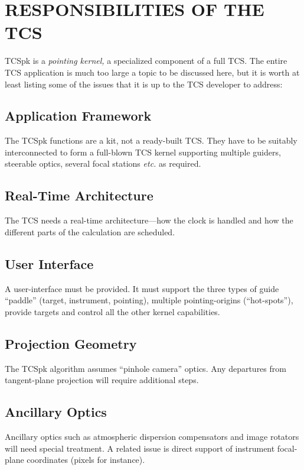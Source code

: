 \documentclass[12pt,fleqn,twoside]{article}
\renewcommand{\_}{{\tt\char'137}}     %
\begin{document}
\newpage
\section {RESPONSIBILITIES OF THE TCS}

TCSpk is a {\it pointing kernel,} a specialized component of
a full TCS.  The entire TCS application
is much too large a topic to be discussed here,
but it is worth at least listing some of the issues that
it is up to the TCS developer to address:

\subsection{Application Framework}

The TCSpk functions are a kit, not a ready-built TCS.
They have to be suitably
interconnected to form a full-blown TCS kernel supporting
multiple guiders, steerable optics, several focal stations {\it
etc.}\/ as required.

\subsection{Real-Time Architecture}

The TCS needs a real-time architecture---how
the clock is handled and how the different parts of the
calculation are scheduled.

\subsection{User Interface}
A user-interface must be provided.  It must support the
three types of guide ``paddle'' (target, instrument, pointing),
multiple pointing-origins (``hot-spots''), provide targets
and control all the other kernel capabilities.

\subsection{Projection Geometry}

The TCSpk algorithm assumes ``pinhole camera'' optics.  Any
departures from tangent-plane projection will require additional
steps.

\subsection{Ancillary Optics}

Ancillary optics such as atmospheric dispersion
compensators and image rotators will need special treatment.  A
related issue is direct support of instrument focal-plane
coordinates (pixels for instance).
\end{document}
